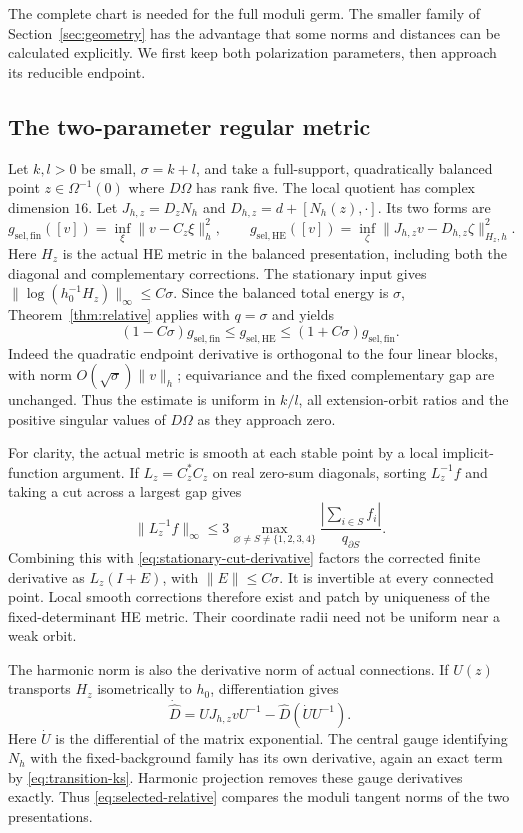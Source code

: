 \documentclass[11pt]{amsart}
\theoremstyle{definition}
\theoremstyle{remark}
\begin{document}
The complete chart is needed for the full moduli germ. The smaller
family of Section~\ref{sec:geometry} has the advantage that some norms
and distances can be calculated explicitly. We first keep both
polarization parameters, then approach its reducible endpoint.

\subsection{The two-parameter regular metric}
Let $k,l>0$ be small, $\sigma=k+l$, and take a full-support,
quadratically balanced point $z\in\Omega^{-1}(0)$ where $D\Omega$
has rank five. The local quotient has complex dimension $16$.
Let $J_{h,z}=D_zN_h$ and $D_{h,z}=d+[N_h(z),\cdot]$. Its two forms are
\[
 g_{\mathrm{sel},\mathrm{fin}}([v])
    =\inf_\xi\|v-C_z\xi\|_h^2,\qquad
 g_{\mathrm{sel},\mathrm{HE}}([v])
    =\inf_\zeta\|J_{h,z}v-D_{h,z}\zeta\|_{H_z,h}^2.
\]
Here $H_z$ is the actual HE metric in the balanced presentation,
including both the diagonal and complementary corrections.
The stationary input gives $\|\log(h_0^{-1}H_z)\|_\infty\le C\sigma$.
Since the balanced total energy is $\sigma$, Theorem~\ref{thm:relative}
applies with $q=\sigma$ and yields
\begin{equation}\label{eq:selected-relative}
 (1-C\sigma)g_{\mathrm{sel},\mathrm{fin}}
 \le g_{\mathrm{sel},\mathrm{HE}}
 \le(1+C\sigma)g_{\mathrm{sel},\mathrm{fin}}.
\end{equation}
Indeed the quadratic endpoint derivative is orthogonal to the four
linear blocks, with norm $O(\sqrt\sigma)\|v\|_h$; equivariance
and the fixed complementary gap are unchanged. Thus the estimate is
uniform in $k/l$, all extension-orbit ratios and the positive singular
values of $D\Omega$ as they approach zero.

For clarity, the actual metric is smooth at each stable point by a
local implicit-function argument. If $L_z=C_z^*C_z$ on real zero-sum diagonals,
sorting $L_z^{-1}f$ and taking a cut across a largest gap gives
\[
 \|L_z^{-1}f\|_\infty
 \le3\max_{\varnothing\ne S\ne\{1,2,3,4\}}
       \frac{|\sum_{i\in S}f_i|}{q_{\partial S}}.
\]
Combining this with \eqref{eq:stationary-cut-derivative} factors the
corrected finite derivative as $L_z(I+E)$, with $\|E\|\le C\sigma$.
It is invertible at every connected point. Local smooth corrections
therefore exist and patch by uniqueness of the fixed-determinant HE
metric. Their coordinate radii need not be uniform near a weak orbit.

The harmonic norm is also the derivative norm of actual connections.
If $U(z)$ transports $H_z$ isometrically to $h_0$, differentiation gives
\[
 \dot{\widehat D}=U J_{h,z}v U^{-1}
                    -\widehat D(\dot U U^{-1}).
\]
Here $\dot U$ is the differential of the matrix exponential. The central gauge identifying
$N_h$ with the fixed-background family has its own derivative, again
an exact term by \eqref{eq:transition-ks}. Harmonic projection removes
these gauge derivatives exactly. Thus \eqref{eq:selected-relative}
compares the moduli tangent norms of the two presentations.
\end{document}
